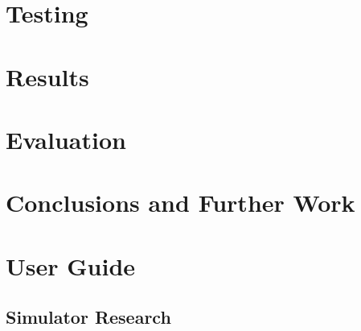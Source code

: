 \documentclass[11pt,a4paper,twoside,openright]{report}
\begin{document}
\chapter{Testing}
%


\chapter{Results}




\chapter{Evaluation}
%


\chapter{Conclusions and Further Work}
%


\chapter{User Guide}



\newpage


\begin{appendices}
\appendix
\chapter{Simulator Research}

\end{appendices}
\end{document}
